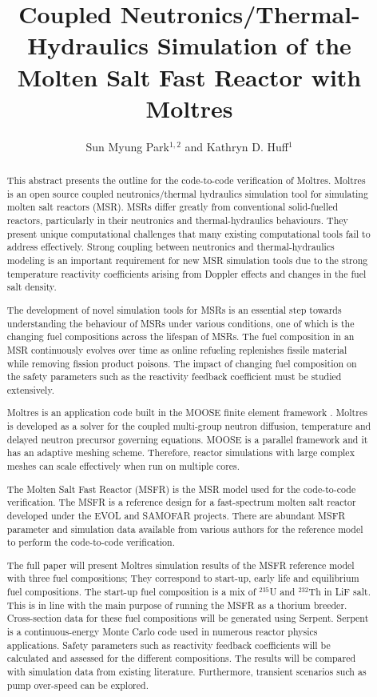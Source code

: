 \documentclass{anstrans}
\title{Coupled Neutronics/Thermal-Hydraulics Simulation of the Molten Salt Fast Reactor with Moltres}
\author{Sun Myung Park$^{1,2}$ and Kathryn D. Huff$^1$}
\institute{$^1$Dept. of Nuclear, Plasma and Radiological Engineering, University of Illinois at Urbana-Champaign \\
$^2$smpark3@illinois.edu}
\begin{document}
\begin{abstract}
%
This abstract presents the outline for the code-to-code verification of Moltres.
Moltres \cite{lindsay_introduction_2018} is an open source coupled neutronics/thermal hydraulics simulation tool for simulating molten salt reactors (MSR).
MSRs differ greatly from conventional solid-fuelled reactors, particularly in their neutronics and thermal-hydraulics behaviours.
They present unique computational challenges that many existing computational tools fail to address effectively.
Strong coupling between neutronics and thermal-hydraulics modeling is an important requirement for new MSR simulation tools due to the strong temperature reactivity coefficients arising from Doppler effects and changes in the fuel salt density. 

The development of novel simulation tools for MSRs is an essential step towards understanding the behaviour of MSRs under various conditions, one of which is the changing fuel compositions across the lifespan of MSRs.
The fuel composition in an MSR continuously evolves over time as online refueling replenishes fissile material while removing fission product poisons. The impact of changing fuel composition on the safety parameters such as the reactivity feedback coefficient must be studied extensively.

Moltres is an application code built in the MOOSE finite element framework \cite{gaston_moose:_2009}.
Moltres is developed as a solver for the coupled multi-group neutron diffusion, temperature and delayed neutron precursor governing equations.
MOOSE is a parallel framework and it has an adaptive meshing scheme.
Therefore, reactor simulations with large complex meshes can scale effectively when run on multiple cores. 

The Molten Salt Fast Reactor (MSFR) is the MSR model used for the code-to-code verification.
The MSFR is a reference design for a fast-spectrum molten salt reactor developed under the EVOL and SAMOFAR projects\cite{serp_molten_2014}.
There are abundant MSFR parameter and simulation data available from various authors \cite{fiorina_modelling_2014} \cite{pettersen_coupled_2016} for the reference model to perform the code-to-code verification.

The full paper will present Moltres simulation results of the MSFR reference model with three fuel compositions;
They correspond to start-up, early life and equilibrium fuel compositions.
The start-up fuel composition is a mix of $^{235}$U and $^{232}$Th in LiF salt.
This is in line with the main purpose of running the MSFR as a thorium breeder.
Cross-section data for these fuel compositions will be generated using Serpent.
Serpent \cite{leppanen_serpent_2015} is a continuous-energy Monte Carlo code used in numerous reactor physics applications.
Safety parameters such as reactivity feedback coefficients will be calculated and assessed for the different compositions.
The results will be compared with simulation data from existing literature.
Furthermore, transient scenarios such as pump over-speed can be explored.

\end{abstract}



\end{document}

